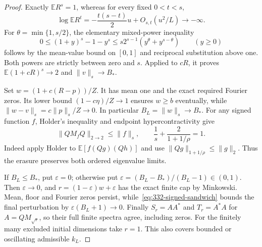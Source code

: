 \documentclass[11pt]{article}
\begin{document}
\begin{proof}
Exactly $\mathbb E R^s=1$, whereas for every fixed $0<t<s$,
\[
 \log\mathbb E R^t=-\frac{t(s-t)}2u+O_{s,t}(u^2/L)\longrightarrow-\infty.
\]
For $\theta=\min\{1,s/2\}$, the elementary mixed-power inequality
\[
 0\le(1+y)^s-1-y^s
 \le s2^{s-1}(y^\theta+y^{s-\theta})\qquad(y\ge0)
\]
follows by the mean-value bound on $[0,1]$ and reciprocal substitution
above one. Both powers are strictly between zero and $s$.
Applied to $cR$, it proves $\mathbb E(1+cR)^s\to2$ and
$\|v\|_s\to B_*$.

Set $w=(1+c(R-p))/Z$. It has mean one and the exact required Fourier
zeros. Its lower bound $(1-c\eta)/Z\to1$ ensures $w\ge b$ eventually,
while $\|w-v\|_s=c\|p\|_s/Z\to0$. In particular $B_L=\|w\|_s\to B_*$.
For any signed function $f$, Holder's inequality and endpoint
hypercontractivity give
\begin{equation}\label{eq:332-signed-sandwich}
 \|QM_fQ\|_{2\to2}\le\|f\|_s,
 \qquad \frac1s+\frac{2}{1+1/\rho}=1.
\end{equation}
Indeed apply Holder to $\mathbb E[f(Qg)(Qh)]$ and use
$\|Qg\|_{1+1/\rho}\le\|g\|_2$. Thus the erasure preserves both
ordered eigenvalue limits.

If $B_L\le B_*$, put $\varepsilon=0$; otherwise put
$\varepsilon=(B_L-B_*)/(B_L-1)\in(0,1)$.
Then $\varepsilon\to0$, and $r=(1-\varepsilon)w+\varepsilon$
has the exact finite cap by Minkowski. Mean, floor and Fourier zeros
persist, while~\eqref{eq:332-signed-sandwich} bounds the final perturbation
by $\varepsilon(B_L+1)\to0$. Finally $S_r=AA^*$ and $T_r=A^*A$ for
$A=QM_{\sqrt r}$, so their full finite spectra agree, including zeros.
For the finitely many excluded initial dimensions take $r=1$.
This also covers bounded or oscillating admissible $k_L$.
\end{proof}
\end{document}
